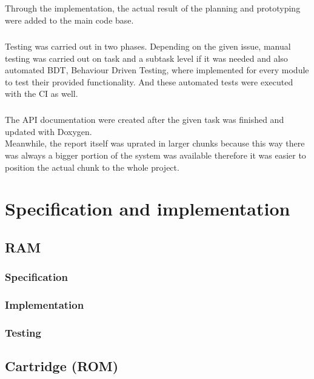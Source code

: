 \documentclass[]{report}
\begin{document}
\paragraph{ }
Through the implementation, the actual result of the planning and prototyping were added to the main code base.

\paragraph{ }
Testing was carried out in two phases. Depending on the given issue, manual testing was carried out on task and a subtask level if it was needed and also automated BDT, Behaviour Driven Testing, where implemented for every module to test their provided functionality. And these automated tests were executed with the CI as well.

\paragraph{ }
The API documentation were created after the given task was finished and updated with Doxygen.
\\
Meanwhile, the report itself was uprated in larger chunks because this way there was always a bigger portion of the system was available therefore it was easier to position the actual chunk to the whole project.

\chapter{Specification and implementation}

\section{RAM}

\subsection{Specification}

\subsection{Implementation}

\subsection{Testing}

\section{Cartridge (ROM)}
\end{document}
